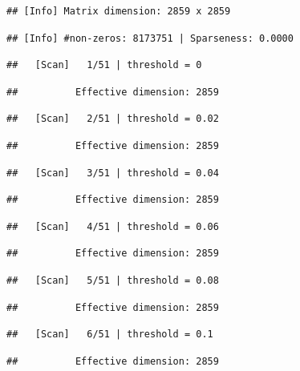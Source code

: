 \documentclass[
]{book}
\begin{document}
\begin{verbatim}
## [Info] Matrix dimension: 2859 x 2859
\end{verbatim}

\begin{verbatim}
## [Info] #non-zeros: 8173751 | Sparseness: 0.0000
\end{verbatim}

\begin{verbatim}
##   [Scan]   1/51 | threshold = 0
\end{verbatim}

\begin{verbatim}
##          Effective dimension: 2859
\end{verbatim}

\begin{verbatim}
##   [Scan]   2/51 | threshold = 0.02
\end{verbatim}

\begin{verbatim}
##          Effective dimension: 2859
\end{verbatim}

\begin{verbatim}
##   [Scan]   3/51 | threshold = 0.04
\end{verbatim}

\begin{verbatim}
##          Effective dimension: 2859
\end{verbatim}

\begin{verbatim}
##   [Scan]   4/51 | threshold = 0.06
\end{verbatim}

\begin{verbatim}
##          Effective dimension: 2859
\end{verbatim}

\begin{verbatim}
##   [Scan]   5/51 | threshold = 0.08
\end{verbatim}

\begin{verbatim}
##          Effective dimension: 2859
\end{verbatim}

\begin{verbatim}
##   [Scan]   6/51 | threshold = 0.1
\end{verbatim}

\begin{verbatim}
##          Effective dimension: 2859
\end{verbatim}
\end{document}
